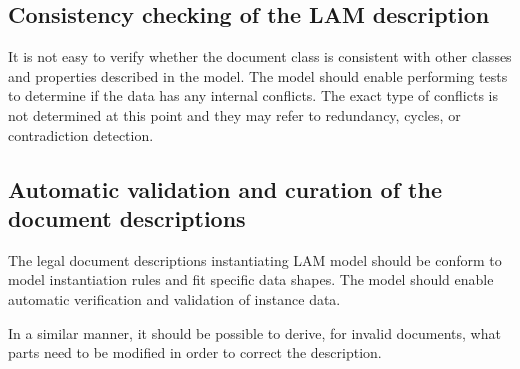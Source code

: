 \subsection{Consistency checking of the LAM
description}\label{consistency-checking-of-the-lam-description}

It is not easy to verify whether the document class is consistent with
other classes and properties described in the model. The model should
enable performing tests to determine if the data has any internal
conflicts. The exact type of conflicts is not determined at this point
and they may refer to redundancy, cycles, or contradiction detection.

\subsection{Automatic validation and curation of the document
descriptions}\label{automatic-validation-and-curation-of-the-document-descriptions}

The legal document descriptions instantiating LAM model should be
conform to model instantiation rules and fit specific data shapes. The
model should enable automatic verification and validation of instance
data.

In a similar manner, it should be possible to derive, for invalid
documents, what parts need to be modified in order to correct the
description.
